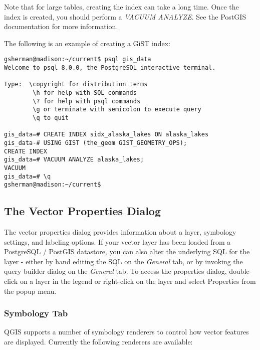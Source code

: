 Note that for large tables, creating the index can take a long time. Once the
index is created, you should perform a \textit{VACUUM ANALYZE}. See the
PostGIS documentation \cite{PostGISweb} for more information.

The following is an example of creating a GiST index:
\begin{verbatim}
gsherman@madison:~/current$ psql gis_data
Welcome to psql 8.0.0, the PostgreSQL interactive terminal.

Type:  \copyright for distribution terms
        \h for help with SQL commands
        \? for help with psql commands
        \g or terminate with semicolon to execute query
        \q to quit

gis_data=# CREATE INDEX sidx_alaska_lakes ON alaska_lakes
gis_data-# USING GIST (the_geom GIST_GEOMETRY_OPS);
CREATE INDEX
gis_data=# VACUUM ANALYZE alaska_lakes;
VACUUM
gis_data=# \q
gsherman@madison:~/current$
\end{verbatim}

\subsection{The Vector Properties Dialog}\label{sec:vectorprops}

The vector properties dialog provides information about a layer, symbology
settings, and labeling options. If your vector layer has been loaded from a
PostgreSQL / PostGIS datastore, you can also alter the underlying SQL for the
layer - either by hand editing the SQL on the \textit{General} tab, or by
invoking the query builder dialog on the \textit{General} tab. To access the
properties dialog, double-click on a layer in the legend or right-click on the
layer and select Properties from the popup menu.

\subsubsection{Symbology Tab}\label{sec:symbology}

QGIS supports a number of symbology renderers to control how
vector features are displayed. Currently the following renderers
are available:


